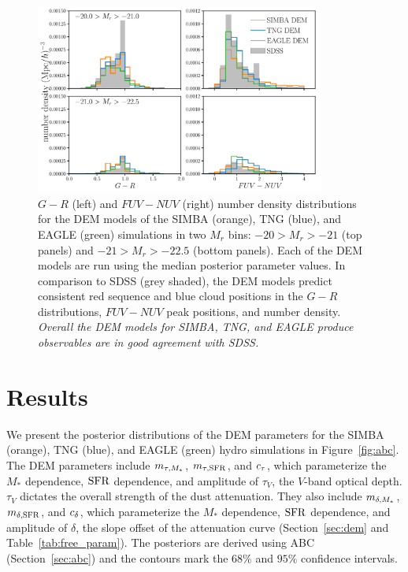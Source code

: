 \begin{figure}
\begin{center}
    \includegraphics[width=0.85\textwidth]{figs/abc_observables_mr_bin.pdf}
    \caption{\label{fig:demcloseup}
    $G-R$ (left) and $FUV-NUV$ (right) number density distributions for the DEM
    models of the SIMBA (orange), TNG (blue), and EAGLE (green) simulations in
    two $M_r$ bins: $-20 > M_r > -21$ (top panels) and $-21 > M_r > -22.5$
    (bottom panels).  Each of the DEM models are run using the median posterior
    parameter values. In comparison to SDSS (grey shaded), the DEM models predict 
    consistent red sequence and blue cloud positions in the $G-R$ distributions, 
    $FUV-NUV$ peak positions, and number density. {\em Overall the DEM
    models for SIMBA, TNG, and EAGLE produce observables are in good agreement 
    with SDSS.}
    }
\end{center}
\end{figure}


\section{Results} \label{sec:results}
We present the posterior distributions of the DEM parameters for the SIMBA
(orange), TNG (blue), and EAGLE (green) hydro simulations in
Figure~\ref{fig:abc}. The DEM parameters include $m_{\tau,M_*}$, $m_{\tau,{\rm SFR}}$, and
$c_\tau$, which parameterize the $M_*$ dependence, ${\rm SFR}$ dependence, and 
amplitude of $\tau_V$, the $V$-band optical depth. $\tau_V$ dictates the
overall strength of the dust attenuation. They also include $m_{\delta,M_*}$,
$m_{\delta,{\rm SFR}}$, and $c_\delta$, which parameterize the $M_*$ dependence, ${\rm SFR}$ dependence,
and amplitude of $\delta$, the slope offset of the attenuation curve
(Section~\ref{sec:dem} and Table~\ref{tab:free_param}). The posteriors 
are derived using ABC (Section~\ref{sec:abc}) and the contours mark the 
$68\%$ and $95\%$ confidence intervals. 

